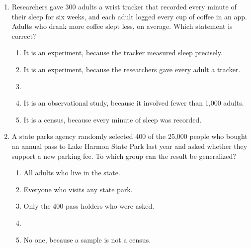 \documentclass[12pt]{article}
\begin{document}
\begin{enumerate}[leftmargin=1.9em, itemsep=0.13in]

  \boxguard[11]
  \item Researchers gave 300 adults a wrist tracker that recorded every minute of their sleep for
        six weeks, and each adult logged every cup of coffee in an app. Adults who drank more
        coffee slept less, on average. Which statement is correct?
        \begin{enumerate}[label=\textbf{(\Alph*)}, leftmargin=2.2em, itemsep=2pt]
          \item It is an experiment, because the tracker measured sleep precisely.
          \item It is an experiment, because the researchers gave every adult a tracker.
          \item {}
          \item It is an observational study, because it involved fewer than 1{,}000 adults.
          \item It is a census, because every minute of sleep was recorded.\hfill{}\rule[-0.2in]{0pt}{0.48in}
        \end{enumerate}

  \boxguard[11]
  \item A state parks agency randomly selected 400 of the 25{,}000 people who bought an annual
        pass to Lake Harmon State Park last year and asked whether they support a new parking
        fee. To which group can the result be generalized?
        \begin{enumerate}[label=\textbf{(\Alph*)}, leftmargin=2.2em, itemsep=2pt]
          \item All adults who live in the state.
          \item Everyone who visits any state park.
          \item Only the 400 pass holders who were asked.
          \item {}
          \item No one, because a sample is not a census.\hfill{}\rule[-0.2in]{0pt}{0.48in}
        \end{enumerate}


\end{enumerate}
\end{document}
